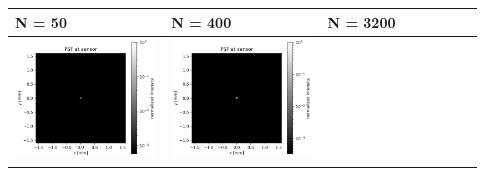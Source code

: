 \documentclass[11pt,a4paper]{article}
\begin{document}
	\begin{table}[H]
		\centering
		\begin{tabular}{>{\centering\arraybackslash}m{0.31\linewidth} >{\centering\arraybackslash}m{0.31\linewidth} >{\centering\arraybackslash}m{0.31\linewidth}}
			\toprule
			\textbf{N = 50} & \textbf{N = 400} & \textbf{N = 3200}\\
			\midrule
			\includegraphics[width=\linewidth,keepaspectratio]{sweep_N/biconvex_psf_50_log.png} &
			\includegraphics[width=\linewidth,keepaspectratio]{sweep_N/biconvex_psf_400_log.png} &

\end{tabular}
\end{table}
\end{document}

